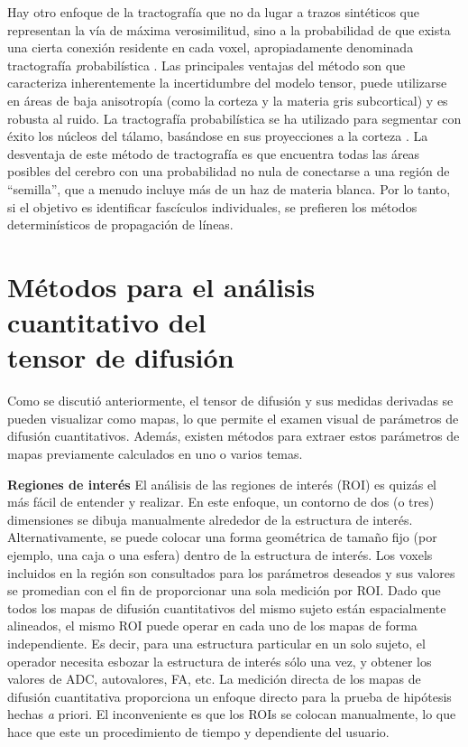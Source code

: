 Hay otro enfoque de la tractografía que no da lugar a trazos sintéticos que representan la vía de máxima verosimilitud, sino a la probabilidad de que exista una cierta conexión residente en cada voxel, apropiadamente denominada tractografía {\emph probabilística} \cite{Behrens_2003}. Las principales ventajas del método son que caracteriza inherentemente la incertidumbre del modelo tensor, puede utilizarse en áreas de baja anisotropía (como la corteza y la materia gris subcortical) y es robusta al ruido. La tractografía probabilística se ha utilizado para segmentar con éxito los núcleos del tálamo, basándose en sus proyecciones a la corteza \cite{Behrens_2003}. La desventaja de este método de tractografía es que encuentra todas las áreas posibles del cerebro con una probabilidad no nula de conectarse a una región de ``semilla'', que a menudo incluye más de un haz de materia blanca. Por lo tanto, si el objetivo es identificar fascículos individuales, se prefieren los métodos determinísticos de propagación de líneas.

\section{Métodos para el análisis cuantitativo del\\ tensor de difusión}

Como se discutió anteriormente, el tensor de difusión y sus medidas derivadas se pueden visualizar como mapas, lo que permite el examen visual de parámetros de difusión cuantitativos. Además, existen métodos para extraer estos parámetros de mapas previamente calculados en uno o varios temas.

\textbf {Regiones de interés} El análisis de las regiones de interés (ROI) es quizás el más fácil de entender y realizar. En este enfoque, un contorno de dos (o tres) dimensiones se dibuja manualmente alrededor de la estructura de interés. Alternativamente, se puede colocar una forma geométrica de tamaño fijo (por ejemplo, una caja o una esfera) dentro de la estructura de interés. Los voxels incluidos en la región son consultados para los parámetros deseados y sus valores se promedian con el fin de proporcionar una sola medición por ROI. Dado que todos los mapas de difusión cuantitativos del mismo sujeto están espacialmente alineados, el mismo ROI puede operar en cada uno de los mapas de forma independiente. Es decir, para una estructura particular en un solo sujeto, el operador necesita esbozar la estructura de interés sólo una vez, y obtener los valores de ADC, autovalores, FA, etc. La medición directa de los mapas de difusión cuantitativa proporciona un enfoque directo para la prueba de hipótesis hechas {\emph a priori}. El inconveniente es que los ROIs se colocan manualmente, lo que hace que este un procedimiento de tiempo y dependiente del usuario.

